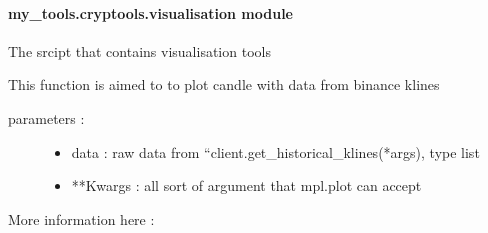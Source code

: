 \documentclass[letterpaper,10pt,english]{sphinxmanual}
\begin{document}
\paragraph{my\_tools.cryptools.visualisation module}
\label{\detokenize{my_tools.cryptools:module-my_tools.cryptools.visualisation}}\label{\detokenize{my_tools.cryptools:my-tools-cryptools-visualisation-module}}
\sphinxAtStartPar
The srcipt that contains visualisation tools

\begin{fulllineitems}
\label{\detokenize{my_tools.cryptools:my_tools.cryptools.visualisation.candle}}
\sphinxAtStartPar
This function is aimed to to plot candle with data from binance klines
\begin{description}
\item[{parameters :}] \leavevmode\begin{itemize}
\item {} 
\sphinxAtStartPar
data : raw data from “client.get\_historical\_klines(*args), type list

\item {} 
\sphinxAtStartPar
**Kwargs : all sort of argument that mpl.plot can accept

\end{itemize}

\end{description}

\sphinxAtStartPar
More information here : 

\end{fulllineitems}

\end{document}
